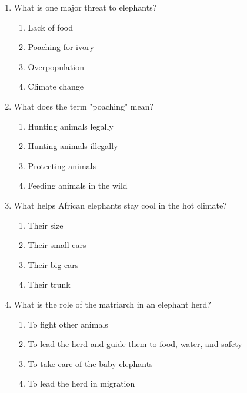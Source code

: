 \documentclass[12pt]{article}
\begin{document}
\begin{enumerate}
    \vspace{0.5cm}

    \item What is one major threat to elephants?

    \begin{enumerate}[label=\Alph*.]
        \item Lack of food
        \item Poaching for ivory
        \item Overpopulation
        \item Climate change
    \end{enumerate}
    
    \vspace{0.5cm}

    \item What does the term "poaching" mean?

    \begin{enumerate}[label=\Alph*.]
        \item Hunting animals legally
        \item Hunting animals illegally
        \item Protecting animals
        \item Feeding animals in the wild
    \end{enumerate}
    
    \vspace{0.5cm}

    \item What helps African elephants stay cool in the hot climate?

    \begin{enumerate}[label=\Alph*.]
        \item Their size
        \item Their small ears
        \item Their big ears
        \item Their trunk
    \end{enumerate}
    
    \vspace{0.5cm}

    \item What is the role of the matriarch in an elephant herd?

    \begin{enumerate}[label=\Alph*.]
        \item To fight other animals
        \item To lead the herd and guide them to food, water, and safety
        \item To take care of the baby elephants
        \item To lead the herd in migration
    \end{enumerate}
    

\end{enumerate}
\end{document}
